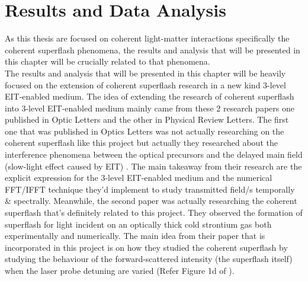 \chapter{Results and Data Analysis}
As this thesis are focused on coherent light-matter interactions specifically the coherent superflash phenomena, the results and analysis that will be presented in this chapter will be crucially related to that phenomena.\\

The results and analysis that will be presented in this chapter will be heavily focused on the extension of coherent superflash research in a new kind 3-level EIT-enabled medium. The idea of extending the research of coherent superflash into 3-level EIT-enabled medium mainly came from these 2 research papers one published in Optic Letters and the other in Physical Review Letters. The first one that was published in Optics Letters was not actually researching on the coherent superflash like this project but actually they researched about the interference phenomena between the optical precursors and the delayed main field (slow-light effect caused by EIT) \cite{Jeong2010}. The main takeaway from their research are the explicit expression for the 3-level EIT-enabled medium and the numerical FFT/IFFT technique they'd implement to study transmitted field/s temporally & spectrally. Meanwhile, the second paper \cite{Kwong2014} was actually researching the coherent superflash that's definitely related to this project. They observed the formation of superflash for light incident on an optically thick cold strontium gas both experimentally and numerically. The main idea from their paper that is incorporated in this project is on how they studied the coherent superflash by studying the behaviour of the forward-scattered intensity (the superflash itself) when the laser probe detuning are varied (Refer Figure 1d of \cite{Kwong2014}).

\newpage

